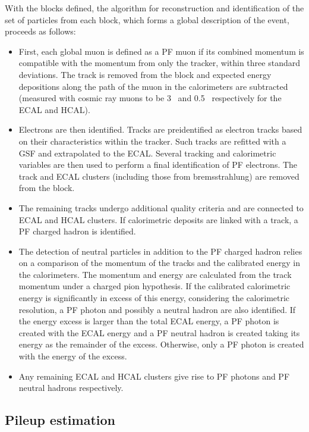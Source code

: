 With the blocks defined, the algorithm for reconstruction and identification of the set of particles from each
block, which forms a global description of the event, proceeds as follows:

\begin{itemize}
\item First, each global muon is defined as a PF muon if its combined momentum is compatible with the momentum 
from only the tracker, within three standard deviations. The track is removed from the block and expected energy depositions
along the path of the muon in the calorimeters are subtracted (measured with
cosmic ray muons to be 3 \GeV~and 0.5 \GeV~respectively for the ECAL and HCAL).
\item Electrons are then identified. Tracks are preidentified as electron tracks based on their 
characteristics within the tracker. Such tracks are refitted with a GSF and extrapolated to the ECAL. 
Several tracking and calorimetric variables are then used to perform a final identification of PF electrons. The track
and ECAL clusters (including those from bremsstrahlung) are removed from the block.
\item The remaining tracks undergo additional quality criteria and are connected to ECAL and HCAL clusters. 
If calorimetric deposits are linked with a track, a PF charged hadron is identified. 
\item The detection of neutral particles in addition to the PF charged hadron 
relies on a comparison of the momentum of the tracks and the calibrated energy in the calorimeters. 
The momentum and energy are calculated from the track momentum under a charged pion hypothesis. 
If the calibrated calorimetric energy is significantly in excess of this energy, considering
the calorimetric resolution, a PF photon and possibly a neutral hadron are also identified. 
If the energy excess is larger than the total ECAL energy, a PF photon is created with the ECAL energy and a 
PF neutral hadron is created taking its energy as the remainder of the excess. 
Otherwise, only a PF photon is created with the energy of the excess.
\item Any remaining ECAL and HCAL clusters give rise to PF photons and PF neutral hadrons respectively.
\end{itemize}

\subsection{Pileup estimation}

